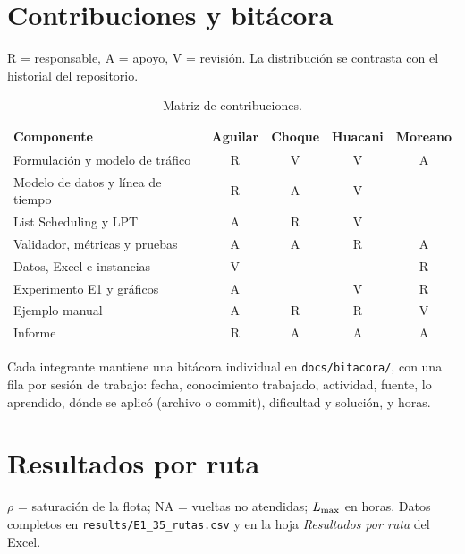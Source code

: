 \section{Contribuciones y bitácora}\label{anx:contrib}
R = responsable, A = apoyo, V = revisión. La distribución se contrasta con el historial del repositorio.
\begin{table}[H]
\centering\small
\caption{Matriz de contribuciones.}
\begin{tabular}{lcccc}
\toprule
Componente & Aguilar & Choque & Huacani & Moreano \\
\midrule
Formulación y modelo de tráfico & R & V & V & A \\
Modelo de datos y línea de tiempo & R & A & V & \\
List Scheduling y LPT & A & R & V & \\
Validador, métricas y pruebas & A & A & R & A \\
Datos, Excel e instancias & V & & & R \\
Experimento E1 y gráficos & A & & V & R \\
Ejemplo manual & A & R & R & V \\
Informe & R & A & A & A \\
\bottomrule
\end{tabular}
\end{table}
Cada integrante mantiene una bitácora individual en \texttt{docs/bitacora/}, con una fila por sesión de trabajo: fecha, conocimiento trabajado, actividad, fuente, lo aprendido, dónde se aplicó (archivo o commit), dificultad y solución, y horas.

\section{Resultados por ruta}\label{anx:rutas}
$\rho$ = saturación de la flota; NA = vueltas no atendidas; $L_{\max}$ en horas. Datos completos en \texttt{results/E1\_35\_rutas.csv} y en la hoja \emph{Resultados por ruta} del Excel.



